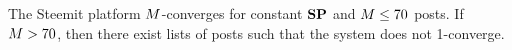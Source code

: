 \begin{corollary}
  \label{corollary:convergence:steem}
  The Steemit platform $M$-converges for constant $\mathrm{\textbf{SP}}$ and
  $M \leq 70$ posts. If $M > 70$, then there exist lists of posts
  such that the system does not 1-converge.
\end{corollary}
